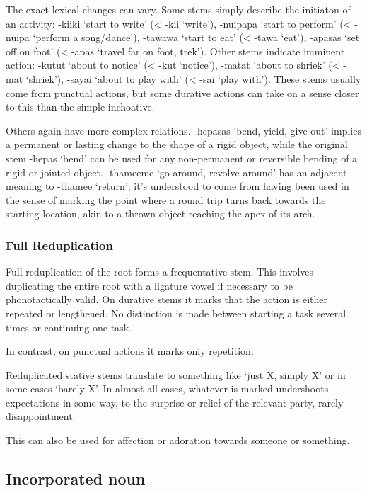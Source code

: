 \documentclass[smallroyalvopaper,9pt]{memoir}
\begin{document}
The exact lexical changes can vary. Some stems simply describe the initiaton of an activity: -kiiki `start to write' (< -kii `write'), -nuipapa `start to perform' (< -nuipa `perform a song/dance'), -tawawa `start to eat' (< -tawa `eat'), -apasas `set off on foot' (< -apas `travel far on foot, trek'). Other stems indicate imminent action: -kutut `about to notice' (< -kut `notice'), -matat `about to shriek' (< -mat `shriek'), -sayai `about to play with' (< -sai `play with'). These stems usually come from punctual actions, but some durative actions can take on a sense closer to this than the simple inchoative.

Others again have more complex relations. -hepasas `bend, yield, give out' implies a permanent or lasting change to the shape of a rigid object, while the original stem -hepas `bend' can be used for any non-permanent or reversible bending of a rigid or jointed object. -thameeme `go around, revolve around' has an adjacent meaning to -thamee `return'; it's understood to come from having been used in the sense of marking the point where a round trip turns back towards the starting location, akin to a thrown object reaching the apex of its arch.

\subsubsection{Full Reduplication}

Full reduplication of the root forms a frequentative stem. This involves duplicating the entire root with a ligature vowel if necessary to be phonotactically valid. On durative stems it marks that the action is either repeated or lengthened. No distinction is made between starting a task several times or continuing one task.


In contrast, on punctual actions it marks only repetition. 


Reduplicated stative stems translate to something like `just X, simply X' or in some cases `barely X'. In almost all cases, whatever is marked undershoots expectations in some way, to the surprise or relief of the relevant party, rarely disappointment.


This can also be used for affection or adoration towards someone or something.


\subsection{Incorporated noun}
\end{document}
